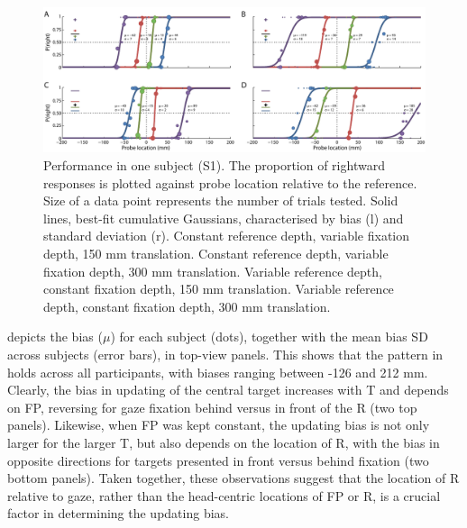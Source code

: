 \begin{figure}
    \includegraphics[width=1.0\textwidth]{src/paper2/figure2.pdf}
    
    \caption{Performance in one subject (S1). The proportion of rightward responses is plotted against probe location relative to the reference. Size of a data point represents the number of trials tested. Solid lines, best-fit cumulative Gaussians, characterised by bias (l) and standard deviation (r).  Constant reference depth, variable fixation depth, 150 \si{\milli\metre} translation.  Constant reference depth, variable fixation depth, 300 \si{\milli\metre} translation.  Variable reference depth, constant fixation depth, 150 \si{\milli\metre} translation.  Variable reference depth, constant fixation depth, 300 \si{\milli\metre}  translation.}
    
    \label{p2:fig2}
\end{figure}

 depicts the bias ($\mu$) for each subject (dots), together with the mean bias {\textpm}SD across subjects (error bars), in top-view panels. This shows that the pattern in  holds across all participants, with biases ranging between -126 and 212 mm. Clearly, the bias in updating of the central target increases with T and depends on FP, reversing for gaze fixation behind versus in front of the R (two top panels). Likewise, when FP was kept constant, the updating bias is not only larger for the larger T, but also depends on the location of R, with the bias in opposite directions for targets presented in front versus behind fixation (two bottom panels). Taken together, these observations suggest that the location of R relative to gaze, rather than the head-centric locations of FP or R, is a crucial factor in determining the updating bias. 

